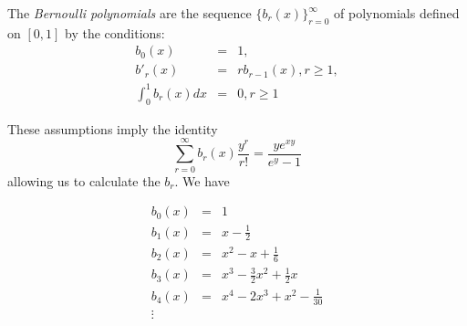 \documentclass[12pt]{article}
\begin{document}
The \emph{Bernoulli polynomials} are the sequence $\{ b_r(x) \} _{r=0}^{\infty}$ of polynomials defined on $[0,1]$ by the conditions:
\begin{eqnarray*}
b_0(x) & = & 1, \\
b'_r(x) & = & r b_{r-1}(x), r \geq 1, \\
\int_0^1 b_r(x)dx & = & 0, r \geq 1
\end{eqnarray*}

These assumptions imply the identity
\[ \sum_{r=0}^{\infty} b_r(x) \frac{y^r}{r!} = \frac{ye^{xy}}{e^y-1} \]
allowing us to calculate the $b_r$. We have

\begin{eqnarray*}
b_0(x) & = & 1 \\
b_1(x) & = & x-\frac{1}{2} \\
b_2(x) & = & x^2 - x + \frac{1}{6} \\
b_3(x) & = & x^3 - \frac{3}{2}x^2 + \frac{1}{2}x \\
b_4(x) & = & x^4 - 2x^3 + x^2 - \frac{1}{30} \\
\vdots & &
\end{eqnarray*}
\end{document}
